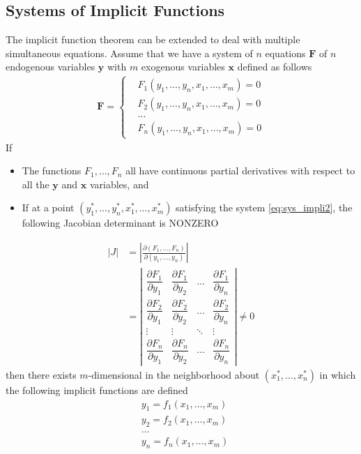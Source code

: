 \documentclass[10pt,a4paper]{book}
\theoremstyle{definition}\newtheorem{definition}{Definition}
\theoremstyle{definition}\newtheorem{fact}{Fact}
\theoremstyle{definition}\newtheorem{ex}{Ex.}
\theoremstyle{definition}\newtheorem{project}{Project}
\theoremstyle{definition}\newtheorem{problem}{Problem}
\theoremstyle{definition}\newtheorem{example}{Example}
\numberwithin{theorem}{chapter}
\numberwithin{corollary}{chapter}
\numberwithin{assumption}{chapter}
\numberwithin{definition}{chapter}
\numberwithin{prop}{chapter}
\numberwithin{notation}{chapter}
\numberwithin{problem}{chapter}
\numberwithin{example}{chapter}
\numberwithin{fact}{chapter}
\numberwithin{ex}{chapter}
\def\F{\mathbf F}
\def\x{\mathbf x}
\def\y{\mathbf y}
\begin{document}
	\subsection{Systems of Implicit Functions}
	The implicit function theorem can be extended to deal with multiple simultaneous equations. Assume that we have a system of $n$ equations $\F$ of $n$ endogenous variables $\y$ with $m$ exogenous variables $\x$ defined as follows
	\begin{align} 
		 \F = \label{eq:sys_impli2}
		 \begin{cases}  &F_1 ( y_1, \dots, y_n, x_1, \dots, x_m) = 0  \\
		&F_2 ( y_1, \dots, y_n, x_1, \dots, x_m) = 0 \\
		&\dots  \\
		&F_n ( y_1, \dots, y_n, x_1, \dots, x_m) = 0 
		\end{cases}  
	\end{align}
	If
	\begin{itemize}
		\item The functions $F_1, \dots, F_n$ all have continuous partial derivatives with respect to all the $\y$ and $\x$ variables, and 
		\item If at a point $( y^*_1, \dots, y^*_n, x^*_1, \dots, x^*_m)$ satisfying the system \eqref{eq:sys_impli2}, the following Jacobian determinant is NONZERO
	\end{itemize}
	\begin{align*}
		|J| &= \left| \frac{\partial (F_1, \dots, F_n)}{\partial (y_1, \dots, y_n)} \right| \\
		&= \left| \begin{matrix}
			\dfrac{\partial F_1}{\partial y_1} & \dfrac{\partial F_1}{\partial y_2} & \dots & \dfrac{\partial F_1}{\partial y_n} \\ 
			\dfrac{\partial F_2}{\partial y_1} & \dfrac{\partial F_2}{\partial y_2} & \dots & \dfrac{\partial F_2}{\partial y_n} \\
			\vdots & \vdots & \ddots & \vdots \\
			\dfrac{\partial F_n}{\partial y_1} & \dfrac{\partial F_n}{\partial y_2} & \dots & \dfrac{\partial F_n}{\partial y_n}
		\end{matrix} \right| \neq 0
	\end{align*}
	then there exists $m$-dimensional in the neighborhood about $(x^*_1,\dots,x^*_n)$ in which the following implicit functions are defined
	\begin{align*}
		&y_1 = f_1 (x_1, \dots, x_m) \\
		&y_2 = f_2 (x_1, \dots, x_m) \\
		&\dots \\
		&y_n = f_n (x_1, \dots, x_m) \\
	\end{align*}
\end{document}
